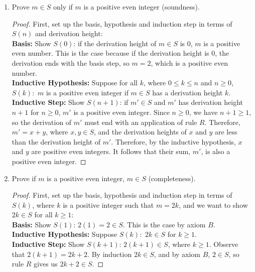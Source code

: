\documentclass[]{exam}
\begin{document}
\begin{questions}
\begin{enumerate}[label=\alph*)]
\item Prove $m \in S$ only if $m$ is a positive even integer (soundness). 
\begin{solution}
\begin{proof}
First, set up the basis, hypothesis and induction step in terms of $S(n)$ and
derivation height:
~\\
\textbf{Basis:} Show $S(0)$: if the derivation height of $m \in S$ is $0$, $m$ is a
positive even number. This is the case because if the derivation height is $0$,
the derivation ends with the basis step, so $m = 2$, which is a positive even
number.
~\\
\textbf{Inductive Hypothesis:} Suppose for all $k$, where $0 \leq k \leq n$ and
$n \geq 0$, $S(k):$ $m$ is a positive even integer if $m \in S$ has a derivation
height $k$.
~\\
\textbf{Inductive Step:} Show $S(n+1)$: if $m' \in S$ and $m'$ has derivation
height $n + 1$ for $n \geq 0$, $m'$ is a positive even integer. Since $n \geq 0$,
we have $n + 1 \geq 1$, so the derivation of $m'$ must end with an application of
rule $R$. Therefore, $m' = x + y$, where $x,y \in S$, and the derivation heights
of $x$ and $y$ are less than the derivation height of $m'$. Therefore, by the
inductive hypothesis, $x$ and $y$ are positive even integers. It follows that
their sum, $m'$, is also a positive even integer.
\end{proof}

\end{solution}
\item Prove if $m$ is a positive even integer, $m \in S$ (completeness).
\begin{solution}
\begin{proof}
First, set up the basis, hypothesis and induction step in terms of $S(k)$,
where $k$ is a positive integer such that $m = 2k$, and we want to show
$2k \in S$ for all $k \geq 1$:
~\\
\textbf{Basis:} Show $S(1)$: $2(1) = 2 \in S$. This is the case by axiom $B$.
~\\
\textbf{Inductive Hypothesis:} Suppose $S(k):$ $2k \in S$ for $k \geq 1$.
~\\
\textbf{Inductive Step:} Show $S(k+1)$: $2(k+1) \in S$, where $k \geq 1$.
Observe that $2(k + 1) = 2k + 2$. By induction $2k \in S$, and by axiom
$B$, $2 \in S$, so rule $R$ gives us $2k + 2 \in S$.
\end{proof}


\end{solution}
\end{enumerate}
\end{questions}
\end{document}
